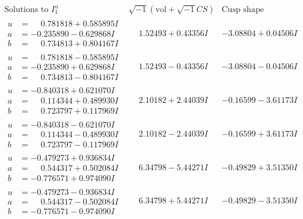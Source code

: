 \documentclass[1p]{elsarticle_modified}
\theoremstyle{definition}
\newcommand{\I}{\sqrt{-1}}
\begin{document}
$$\begin{array}{c|c|c}  
\text{Solutions to }I^u_{1}& \I (\text{vol} + \sqrt{-1}CS) & \text{Cusp shape}\\
 \hline 
\begin{aligned}
u &= \phantom{-}0.781818 + 0.585895 I \\
a &= -0.235890 - 0.629868 I \\
b &= \phantom{-}0.734813 + 0.804167 I\end{aligned}
 & \phantom{-}1.52493 + 0.43356 I & -3.08804 + 0.04506 I \\ \hline\begin{aligned}
u &= \phantom{-}0.781818 - 0.585895 I \\
a &= -0.235890 + 0.629868 I \\
b &= \phantom{-}0.734813 - 0.804167 I\end{aligned}
 & \phantom{-}1.52493 - 0.43356 I & -3.08804 - 0.04506 I \\ \hline\begin{aligned}
u &= -0.840318 + 0.621070 I \\
a &= \phantom{-}0.114344 + 0.489930 I \\
b &= \phantom{-}0.723797 + 0.117969 I\end{aligned}
 & \phantom{-}2.10182 + 2.44039 I & -0.16599 - 3.61173 I \\ \hline\begin{aligned}
u &= -0.840318 - 0.621070 I \\
a &= \phantom{-}0.114344 - 0.489930 I \\
b &= \phantom{-}0.723797 - 0.117969 I\end{aligned}
 & \phantom{-}2.10182 - 2.44039 I & -0.16599 + 3.61173 I \\ \hline\begin{aligned}
u &= -0.479273 + 0.936834 I \\
a &= \phantom{-}0.544317 + 0.502084 I \\
b &= -0.776571 + 0.974090 I\end{aligned}
 & \phantom{-}6.34798 - 5.44271 I & -0.49829 + 3.51350 I \\ \hline\begin{aligned}
u &= -0.479273 - 0.936834 I \\
a &= \phantom{-}0.544317 - 0.502084 I \\
b &= -0.776571 - 0.974090 I\end{aligned}
 & \phantom{-}6.34798 + 5.44271 I & -0.49829 - 3.51350 I \\ \hline\begin{aligned}

\end{aligned}
\end{array}$$
\end{document}
